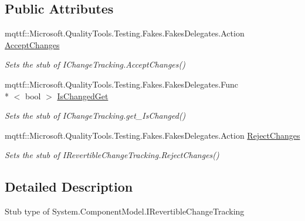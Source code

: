 \subsection*{Public Attributes}
\begin{DoxyCompactItemize}
\item 
mqttf\-::\-Microsoft.\-Quality\-Tools.\-Testing.\-Fakes.\-Fakes\-Delegates.\-Action \hyperlink{class_system_1_1_component_model_1_1_fakes_1_1_stub_i_revertible_change_tracking_aea00d3b21e169c213b7563b68826df90}{Accept\-Changes}
\begin{DoxyCompactList}\small\item\em Sets the stub of I\-Change\-Tracking.\-Accept\-Changes()\end{DoxyCompactList}\item 
mqttf\-::\-Microsoft.\-Quality\-Tools.\-Testing.\-Fakes.\-Fakes\-Delegates.\-Func\\*
$<$ bool $>$ \hyperlink{class_system_1_1_component_model_1_1_fakes_1_1_stub_i_revertible_change_tracking_a7529beee31ead78982801f7a51120fbc}{Is\-Changed\-Get}
\begin{DoxyCompactList}\small\item\em Sets the stub of I\-Change\-Tracking.\-get\-\_\-\-Is\-Changed()\end{DoxyCompactList}\item 
mqttf\-::\-Microsoft.\-Quality\-Tools.\-Testing.\-Fakes.\-Fakes\-Delegates.\-Action \hyperlink{class_system_1_1_component_model_1_1_fakes_1_1_stub_i_revertible_change_tracking_a4ead3e64766ded73ab8e1eed8c3c489b}{Reject\-Changes}
\begin{DoxyCompactList}\small\item\em Sets the stub of I\-Revertible\-Change\-Tracking.\-Reject\-Changes()\end{DoxyCompactList}\end{DoxyCompactItemize}


\subsection{Detailed Description}
Stub type of System.\-Component\-Model.\-I\-Revertible\-Change\-Tracking




